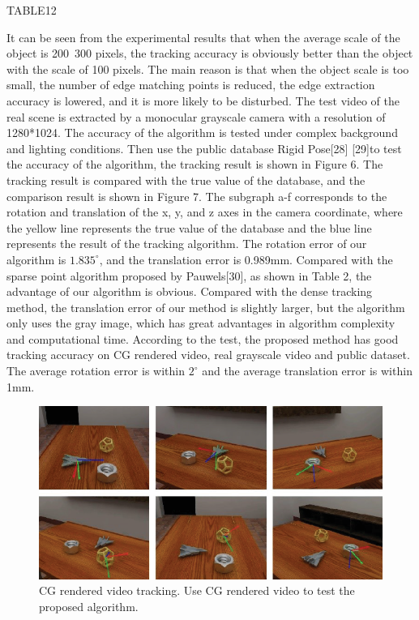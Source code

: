 \documentclass{cta-author}
\begin{document}
  TABLE12

  It can be seen from the experimental results that when the average scale of the object is 200~300 pixels, the tracking accuracy is obviously better than the object with the scale of 100 pixels. The main reason is that when the object scale is too small, the number of edge matching points is reduced, the edge extraction accuracy is lowered, and it is more likely to be disturbed.
The test video of the real scene is extracted by a monocular grayscale camera with a resolution of 1280*1024. The accuracy of the algorithm is tested under complex background and lighting conditions. Then use the public database Rigid Pose[28] [29]to test the accuracy of the algorithm, the tracking result is shown in Figure 6. The tracking result is compared with the true value of the database, and the comparison result is shown in Figure 7. The subgraph a-f corresponds to the rotation and translation of the x, y, and z axes in the camera coordinate, where the yellow line represents the true value of the database and the blue line represents the result of the tracking algorithm. The rotation error of our algorithm is $1.835^{\circ}$, and the translation error is 0.989mm. Compared with the sparse point algorithm proposed by Pauwels[30], as shown in Table 2, the advantage of our algorithm is obvious. Compared with the dense tracking method, the translation error of our method is slightly larger, but the algorithm only uses the gray image, which has great advantages in algorithm complexity and computational time. According to the test, the proposed method has good tracking accuracy on CG rendered video, real grayscale video and public dataset. The average rotation error is within $2^{\circ}$ and the average translation error is within 1mm. 
\begin{figure}[!h]
  \centering
  \includegraphics{fig5.eps}
  \caption{ CG rendered video tracking. Use CG rendered video to test the proposed algorithm.}
  \label{5}
  \end{figure}
\end{document}
